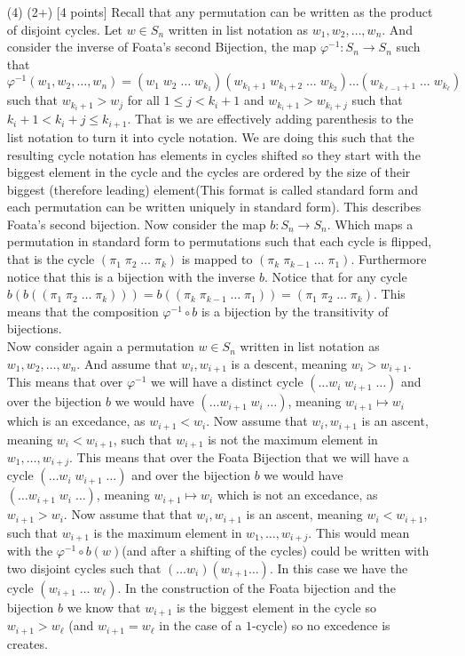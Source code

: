 \documentclass[12pt]{amsart}
\theoremstyle{definition}
\newcommand{\ra}{\rightarrow}
\begin{document}
\begin{itemize}
\item[(4)] (2+) [4 points]
Recall that any permutation can be written as the product of disjoint cycles.
Let $w\in S_n$ written in list notation as $w_1,w_2,\dots,w_n$. And consider the inverse of Foata's second Bijection, the map $\varphi^{-1}:S_n\ra S_n$ such that $\varphi^{-1}(w_1,w_2,\dots,w_n)= (w_1\;w_2\;\dots\;w_{k_1})(w_{k_1+1}\;w_{k_1+2}\;\dots\;w_{k_2})\dots (w_{k_{\ell-1}+1}\;\dots\; w_{k_\ell})$ such that $w_{k_{i}+1}>w_{j}$ for all $1\leq j<k_{i}+1$ and $w_{k_{i}+1}>w_{k_{i}+j}$ such that $k_i+1<k_i+j\leq k_{i+1}$. That is we are effectively adding parenthesis to the list notation to turn it into cycle notation. We are doing this such that the resulting cycle notation has elements in cycles shifted so they start with the biggest element in the cycle and the cycles are ordered by the size of their biggest (therefore leading) element(This format is called standard form and each permutation can be written uniquely in standard form). This describes Foata's second bijection. Now consider the map $b:S_n\ra S_n$. Which maps a permutation in standard form to permutations such that each cycle is flipped, that is the cycle $(\pi_1\;\pi_2\;\dots\; \pi_k)$ is mapped to $(\pi_k\;\pi_{k-1}\;\dots\; \pi_1)$. Furthermore notice that this is a bijection with the inverse $b$. Notice that for any cycle $b(b((\pi_1\;\pi_2\;\dots\; \pi_k)))=b((\pi_k\;\pi_{k-1}\;\dots\; \pi_1))=(\pi_1\;\pi_2\;\dots\; \pi_k)$. This means that the composition $\varphi^{-1}\circ b$ is a bijection by the transitivity of bijections.\\

Now consider again a permutation $w\in S_n$ written in list notation as $w_1,w_2,\dots,w_n$. And assume that $w_i,w_{i+1}$ is a descent, meaning $w_i>w_{i+1}$. This means that over $\varphi^{-1}$ we will have a distinct cycle $(\dots w_{i}\;w_{i+1}\;\dots)$ and over the bijection $b$ we would have $(\dots w_{i+1}\;w_{i}\;\dots)$, meaning $w_{i+1}\mapsto w_{i}$ which is an excedance, as $w_{i+1}<w_{i}$. Now assume that $w_i,w_{i+1}$ is an ascent, meaning $w_i<w_{i+1}$, such that $w_{i+1}$ is not the maximum element in $w_1,\dots,w_{i+j}$. 
This means that over the Foata Bijection that we will have a cycle $(\dots w_{i}\;w_{i+1}\;\dots)$ and over the bijection $b$ we would have $(\dots w_{i+1}\;w_{i}\;\dots)$, meaning $w_{i+1}\mapsto w_{i}$ which is not an excedance, as $w_{i+1}>w_{i}$. 
Now assume that that $w_i,w_{i+1}$ is an ascent, meaning $w_i<w_{i+1}$, such that $w_{i+1}$ is the maximum element in $w_1,\dots,w_{i+j}$. This would mean with the $\varphi^{-1}\circ b(w)$(and after a shifting of the cycles) could be written with two disjoint cycles such that $(\dots w_{i})(w_{i+1}\dots)$. In this case we have 
the cycle $(w_{i+1}\;\dots\;w_{\ell})$. In the construction of the Foata bijection and the bijection $b$ we know that $w_{i+1}$ is the biggest element in the cycle so $w_{i+1}>w_\ell$ (and $w_{i+1}=w_\ell$ in the case of a $1$-cycle) so no excedence is creates. \\


\end{itemize}
\end{document}
